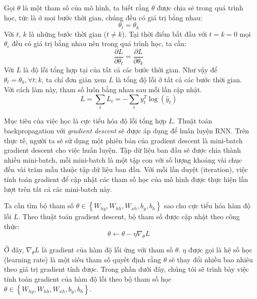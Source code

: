 Gọi $\theta$ là một tham số của mô hình, ta biết rằng $\theta$ được chia sẻ trong quá trình học, tức là ở mọi bước thời gian, chúng đều có giá trị bằng nhau:
\begin{equation} \label{weightSharing1}
	\theta_t = \theta_k
\end{equation}
Với $t$, $k$ là những bước thời gian ($t \ne k$). Tại thời điểm bắt đầu với $t=k=0$ mọi $\theta_i$ đều có giá trị bằng nhau nên trong quá trình học, ta cần:
\begin{equation} \label{weightSharing2}
	\frac{\partial L}{\partial \theta_t} = \frac{\partial L}{\partial \theta_k}
\end{equation}
Với $L$ là độ lỗi tổng hợp tại của tất cả các bước thời gian. Như vậy để $\theta_t = \theta_k, \forall t;k$, ta chỉ đơn giản xem $L$ là tổng độ lỗi ở tất cả các bước thời gian. Với cách làm này, tham số luôn bằng nhau sau mỗi lần cập nhật.
\begin{equation} \label{errorOfAll}
	L = \sum_{t}L_t = - \sum_{t} y_t^{T} \log(\hat{y}_t) 
\end{equation}

Mục tiêu của việc học là cực tiểu hóa độ lỗi tổng hợp $L$. Thuật toán backpropagation với \textit{gradient descent} sẽ được áp dụng để huấn luyện RNN. Trên thực tế, người ta sẽ sử dụng một phiên bản của gradient descent là mini-batch gradient descent cho việc huấn luyện. Tập dữ liệu ban đầu sẽ được chia thành nhiều mini-batch, mỗi mini-batch là một tập con với số lượng khoảng vài chục đến vài trăm mẫu thuộc tập dữ liệu ban đầu. Với mỗi lần duyệt (iteration), việc tính toán gradient để cập nhật các tham số học của mô hình được thực hiện lần lượt trên tất cả các mini-batch này.

Ta cần tìm bộ tham số $\theta \in \left\{W_{hy},W_{hh},W_{xh},b_y,b_h \right \}$ sao cho cực tiểu hóa hàm độ lỗi $L$. Theo thuật toán gradient descent, bộ tham số được cập nhật theo công thức:
\begin{equation} \label{gradientDescentWithTheta}
	\theta \leftarrow \theta - \eta \nabla_{\theta} L
\end{equation}

Ở đây, $\nabla_{\theta} L$ là gradient của hàm độ lỗi ứng với tham số $\theta$. $\eta$ được gọi là hệ số học (learning rate) là một siêu tham số quyết định rằng $\theta$ sẽ thay đổi nhiều bao nhiêu theo giá trị gradient tính được. Trong phần dưới đây, chúng tôi sẽ trình bày việc tính toán gradient của hàm độ lỗi theo bộ tham số học $\theta \in \left\{W_{hy},W_{hh},W_{xh},b_y,b_h \right \}$.


